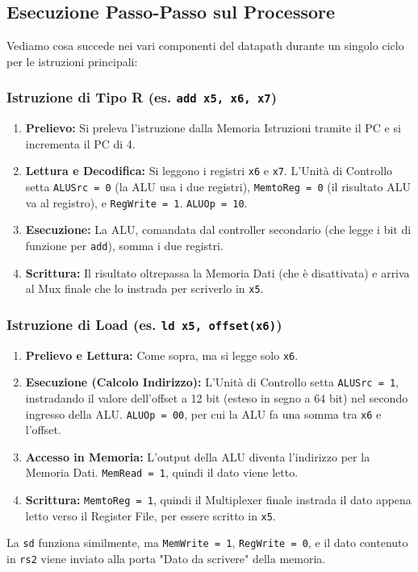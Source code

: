 \documentclass[12pt, a4paper]{article}
\begin{document}
\subsection{Esecuzione Passo-Passo sul Processore}
Vediamo cosa succede nei vari componenti del datapath durante un singolo ciclo per le istruzioni principali:

\subsubsection{Istruzione di Tipo R (es. \texttt{add x5, x6, x7})}
\begin{enumerate}
    \item \textbf{Prelievo:} Si preleva l'istruzione dalla Memoria Istruzioni tramite il PC e si incrementa il PC di 4.
    \item \textbf{Lettura e Decodifica:} Si leggono i registri \texttt{x6} e \texttt{x7}. L'Unità di Controllo setta \texttt{ALUSrc = 0} (la ALU usa i due registri), \texttt{MemtoReg = 0} (il risultato ALU va al registro), e \texttt{RegWrite = 1}. \texttt{ALUOp = 10}.
    \item \textbf{Esecuzione:} La ALU, comandata dal controller secondario (che legge i bit di funzione per \texttt{add}), somma i due registri.
    \item \textbf{Scrittura:} Il risultato oltrepassa la Memoria Dati (che è disattivata) e arriva al Mux finale che lo instrada per scriverlo in \texttt{x5}.
\end{enumerate}


\subsubsection{Istruzione di Load (es. \texttt{ld x5, offset(x6)})}
\begin{enumerate}
    \item \textbf{Prelievo e Lettura:} Come sopra, ma si legge solo \texttt{x6}.
    \item \textbf{Esecuzione (Calcolo Indirizzo):} L'Unità di Controllo setta \texttt{ALUSrc = 1}, instradando il valore dell'offset a 12 bit (esteso in segno a 64 bit) nel secondo ingresso della ALU. \texttt{ALUOp = 00}, per cui la ALU fa una somma tra \texttt{x6} e l'offset.
    \item \textbf{Accesso in Memoria:} L'output della ALU diventa l'indirizzo per la Memoria Dati. \texttt{MemRead = 1}, quindi il dato viene letto.
    \item \textbf{Scrittura:} \texttt{MemtoReg = 1}, quindi il Multiplexer finale instrada il dato appena letto verso il Register File, per essere scritto in \texttt{x5}.
\end{enumerate}
La \texttt{sd} funziona similmente, ma \texttt{MemWrite = 1}, \texttt{RegWrite = 0}, e il dato contenuto in \texttt{rs2} viene inviato alla porta "Dato da scrivere" della memoria.
\end{document}

